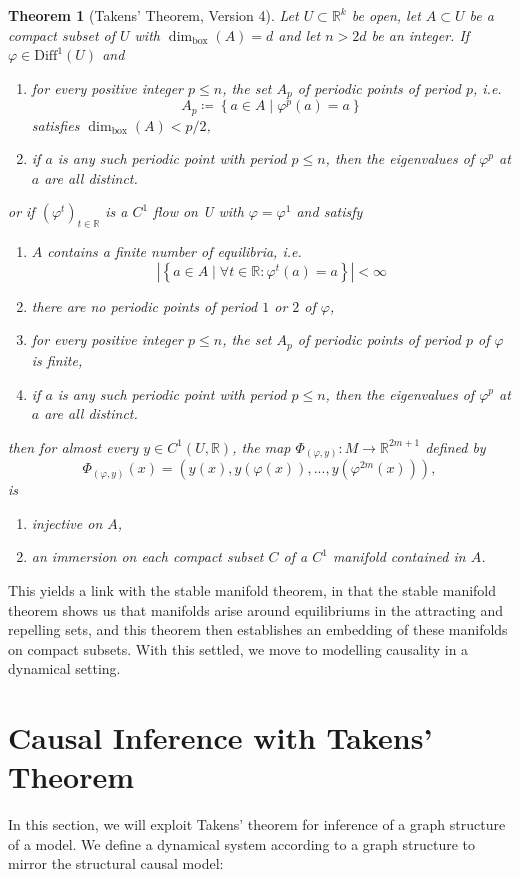 \documentclass[11pt, a4paper]{memoir}
\theoremstyle{break}
\newtheorem{thm}{Theorem}
\theoremstyle{break}
\theoremstyle{nonumberplain}
\newcommand{\mR}{\mathbb{R}}
\newcommand{\abs}[1]{\left| #1\right|}
\begin{document}
\begin{thm}[Takens' Theorem, Version 4]
Let $U\subset \mR^k$ be open, let $A\subset U$ be a compact subset of $U$ with $\dim_\text{box}(A)=d$ and let $n>2d$ be an integer. If $\varphi\in\text{Diff}^1(U)$ and
\begin{enumerate}[label=\arabic*)]
	\item for every positive integer $p\leqslant n$, the set $A_p$ of periodic points of period $p$, i.e.
	$$A_p\coloneqq \left\{a\in A\mid \varphi^p(a)=a\right\}$$
	satisfies $\dim_\text{box}(A)<p/2$,
	\item if $a$ is any such periodic point with period $p\leqslant n$, then the eigenvalues of $\varphi^p$ at $a$ are all distinct.
\end{enumerate}
or if $(\varphi^t)_{t\in \mR}$ is a $C^1$ flow on U with $\varphi=\varphi^1$ and satisfy
\begin{enumerate}[label=\arabic*)]
	\item $A$ contains a finite number of equilibria, i.e.
	$$\abs{\left\{a\in A\mid \forall
	 t\in \mR: \varphi^t(a)=a\right\}}<\infty$$
	 \item there are no periodic points of period $1$ or $2$ of $\varphi$,
	\item for every positive integer $p\leqslant n$, the set $A_p$ of periodic points of period $p$ of $\varphi$ is finite,
	\item if $a$ is any such periodic point with period $p\leqslant n$, then the eigenvalues of $\varphi^p$ at $a$ are all distinct.
\end{enumerate}
then for almost every $y\in C^1(U,\mR)$, the map $\Phi_{(\varphi,y)}:M\to \mathbb{R}^{2m+1}$ defined by
$$\Phi_{(\varphi,y)}(x)=(y(x),y(\varphi(x)),...,y(\varphi^{2m}(x))),$$
is
\begin{enumerate}[label=\roman*)]
	\item injective on $A$,
	\item an immersion on each compact subset $C$ of a $C^1$ manifold contained in $A$.
\end{enumerate}
\end{thm} 
This yields a link with the stable manifold theorem, in that the stable manifold theorem shows us that manifolds arise around equilibriums in the attracting and repelling sets, and this theorem then establishes an embedding of these manifolds on compact subsets. With this settled, we move to modelling causality in a dynamical setting.

\section{Causal Inference with Takens' Theorem}
In this section, we will exploit Takens' theorem for inference of a graph structure of a model. We define a dynamical system according to a graph structure to mirror the structural causal model:
\end{document}
